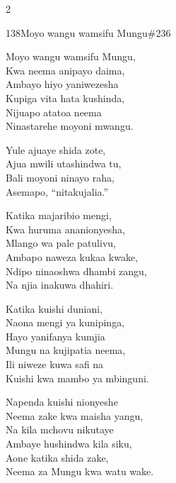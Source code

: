 \documentclass{article}
\begin{document}
\begin{multicols}{2}
\begin{hymn}{138}{Moyo wangu wamsifu Mungu}{\#236}
\begin{stanza}
Moyo wangu wamsifu Mungu,\\
Kwa neema anipayo daima,\\
Ambayo hiyo yaniwezesha\\
Kupiga vita hata kushinda,\\
Nijuapo atatoa neema\\
Ninastarehe moyoni mwangu.
\end{stanza}
\begin{chorus}
Yule ajuaye shida zote,\\
Ajua mwili utashindwa tu,\\
Bali moyoni ninayo raha,\\
Asemapo, ``nitakujalia.''
\end{chorus}
\begin{stanza}
Katika majaribio mengi,\\
Kwa huruma ananionyesha,\\
Mlango wa pale patulivu,\\
Ambapo naweza kukaa kwake,\\
Ndipo ninaoshwa dhambi zangu,\\
Na njia inakuwa dhahiri.
\end{stanza}
\begin{stanza}
Katika kuishi duniani,\\
Naona mengi ya kunipinga,\\
Hayo yanifanya kumjia\\
Mungu na kujipatia neema,\\
Ili niweze kuwa safi na\\
Kuishi kwa mambo ya mbinguni.
\end{stanza}
\begin{stanza}
Napenda kuishi nionyeshe\\
Neema zake kwa maisha yangu,\\
Na kila mchovu nikutaye\\
Ambaye hushindwa kila siku,\\
Aone katika shida zake,\\
Neema za Mungu kwa watu wake.
\end{stanza}
\end{hymn}


\end{multicols}
\end{document}
